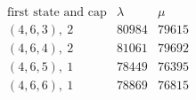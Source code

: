 \[
\begin{array}{c|rr}
\text{first state and cap}&\lambda&\mu\\ \hline
(4,6,3),\ 2&80984&79615\\
(4,6,4),\ 2&81061&79692\\
(4,6,5),\ 1&78449&76395\\
(4,6,6),\ 1&78869&76815\\
\end{array}
\]

